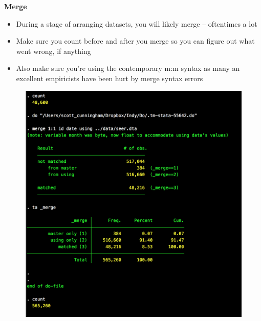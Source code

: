 \documentclass[notes=show]{beamer}
\begin{document}
\begin{frame}[plain]
\begin{center}
\textbf{Merge}
\end{center}

\begin{itemize}
\item During a stage of arranging datasets, you will likely merge -- oftentimes a lot
\item Make sure you count before and after you merge so you can figure out what went wrong, if anything
\item Also make sure you're using the contemporary m:m syntax as many an excellent empiricists have been hurt by merge syntax errors
\end{itemize}

\end{frame}


\begin{frame}[plain]

\begin{figure}
\centering
\includegraphics[scale=0.2]{./lecture_includes/merge.png}
\end{figure}

\end{frame}
\end{document}
